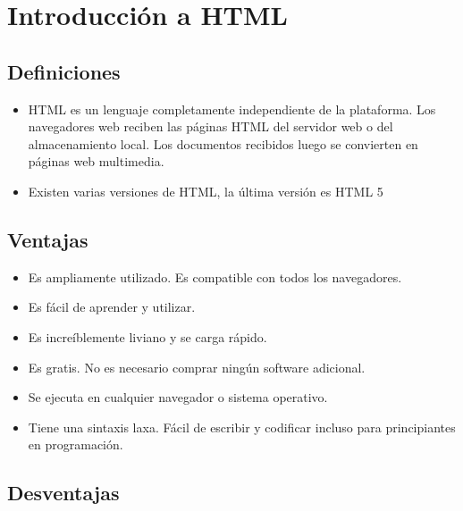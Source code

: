 \section{Introducción a HTML}


\subsection*{Definiciones}
\begin{itemize}
    \item HTML es un lenguaje completamente independiente de la
    plataforma. Los navegadores web reciben las páginas HTML
    del servidor web o del almacenamiento local. Los documentos
    recibidos luego se convierten en páginas web multimedia.
    \item Existen varias versiones de HTML, la última versión es HTML 5    
\end{itemize}

\subsection*{Ventajas}

\begin{itemize}
    \item Es ampliamente utilizado. Es compatible con todos los navegadores.
    \item Es fácil de aprender y utilizar.
    \item Es increíblemente liviano y se carga rápido.
    \item Es gratis. No es necesario comprar ningún software adicional.
    \item Se ejecuta en cualquier navegador o sistema operativo.
    \item Tiene una sintaxis laxa. Fácil de escribir y codificar incluso para principiantes en programación.
\end{itemize}

\subsection*{Desventajas}


